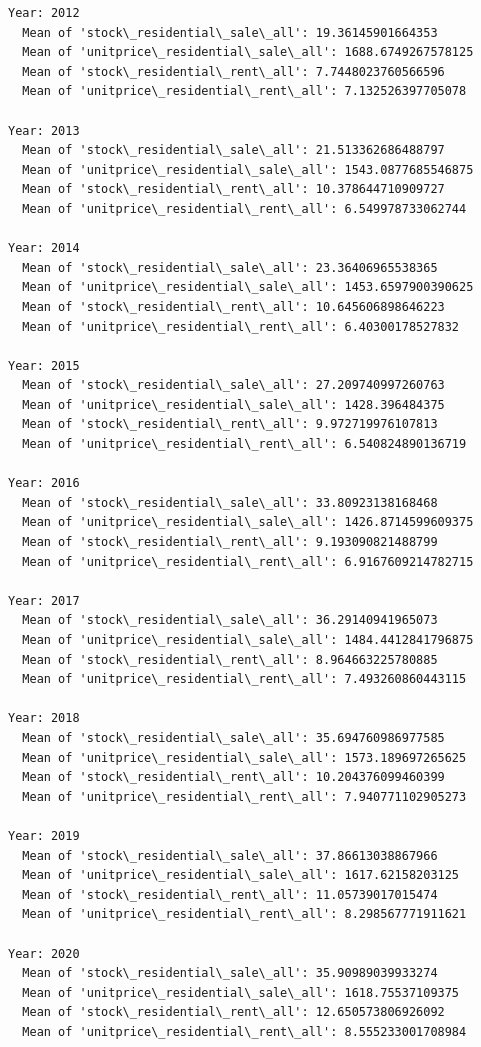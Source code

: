\documentclass[11pt]{article}
\begin{document}
    \begin{Verbatim}[commandchars=\\\{\}]
Year: 2012
  Mean of 'stock\_residential\_sale\_all': 19.36145901664353
  Mean of 'unitprice\_residential\_sale\_all': 1688.6749267578125
  Mean of 'stock\_residential\_rent\_all': 7.7448023760566596
  Mean of 'unitprice\_residential\_rent\_all': 7.132526397705078

Year: 2013
  Mean of 'stock\_residential\_sale\_all': 21.513362686488797
  Mean of 'unitprice\_residential\_sale\_all': 1543.0877685546875
  Mean of 'stock\_residential\_rent\_all': 10.378644710909727
  Mean of 'unitprice\_residential\_rent\_all': 6.549978733062744

Year: 2014
  Mean of 'stock\_residential\_sale\_all': 23.36406965538365
  Mean of 'unitprice\_residential\_sale\_all': 1453.6597900390625
  Mean of 'stock\_residential\_rent\_all': 10.645606898646223
  Mean of 'unitprice\_residential\_rent\_all': 6.40300178527832

Year: 2015
  Mean of 'stock\_residential\_sale\_all': 27.209740997260763
  Mean of 'unitprice\_residential\_sale\_all': 1428.396484375
  Mean of 'stock\_residential\_rent\_all': 9.972719976107813
  Mean of 'unitprice\_residential\_rent\_all': 6.540824890136719

Year: 2016
  Mean of 'stock\_residential\_sale\_all': 33.80923138168468
  Mean of 'unitprice\_residential\_sale\_all': 1426.8714599609375
  Mean of 'stock\_residential\_rent\_all': 9.193090821488799
  Mean of 'unitprice\_residential\_rent\_all': 6.9167609214782715

Year: 2017
  Mean of 'stock\_residential\_sale\_all': 36.29140941965073
  Mean of 'unitprice\_residential\_sale\_all': 1484.4412841796875
  Mean of 'stock\_residential\_rent\_all': 8.964663225780885
  Mean of 'unitprice\_residential\_rent\_all': 7.493260860443115

Year: 2018
  Mean of 'stock\_residential\_sale\_all': 35.694760986977585
  Mean of 'unitprice\_residential\_sale\_all': 1573.189697265625
  Mean of 'stock\_residential\_rent\_all': 10.204376099460399
  Mean of 'unitprice\_residential\_rent\_all': 7.940771102905273

Year: 2019
  Mean of 'stock\_residential\_sale\_all': 37.86613038867966
  Mean of 'unitprice\_residential\_sale\_all': 1617.62158203125
  Mean of 'stock\_residential\_rent\_all': 11.05739017015474
  Mean of 'unitprice\_residential\_rent\_all': 8.298567771911621

Year: 2020
  Mean of 'stock\_residential\_sale\_all': 35.90989039933274
  Mean of 'unitprice\_residential\_sale\_all': 1618.75537109375
  Mean of 'stock\_residential\_rent\_all': 12.650573806926092
  Mean of 'unitprice\_residential\_rent\_all': 8.555233001708984


\end{Verbatim}
\end{document}
